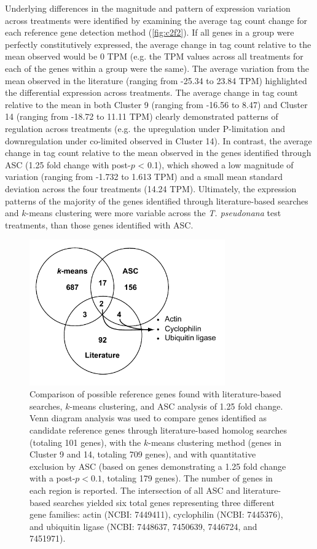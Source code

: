	Underlying differences in the magnitude and pattern of expression variation across treatments were identified by examining the average tag count change for each reference gene detection method (\cref{fig:c2f2}). If all genes in a group were perfectly constitutively expressed, the average change in tag count relative to the mean observed would be 0 TPM (e.g. the TPM values across all treatments for each of the genes within a group were the same). The average variation from the mean observed in the literature (ranging from -25.34 to 23.84 TPM) highlighted the differential expression across treatments. The average change in tag count relative to the mean in both Cluster 9 (ranging from -16.56 to 8.47) and Cluster 14 (ranging from -18.72 to 11.11 TPM) clearly demonstrated patterns of regulation across treatments (e.g. the upregulation under P-limitation and downregulation under co-limited observed in Cluster 14). In contrast, the average change in tag count relative to the mean observed in the genes identified through ASC (1.25 fold change with post-$p$ < 0.1), which showed a low magnitude of variation (ranging from -1.732 to 1.613 TPM) and a small mean standard deviation across the four treatments (14.24 TPM). Ultimately, the expression patterns of the majority of the genes identified through literature-based searches and $k$-means clustering were more variable across the \textit{T. pseudonana} test treatments, than those genes identified with ASC.\par	
\begin{figure}[h!]
  \centering
    \includegraphics[width=0.75\textwidth]{Images/C2_Figure3_v6_bw.pdf}
    \caption[Comparison of putative reference genes identified through literature, $k$-means clustering, and ASC analysis]{Comparison of possible reference genes found with literature-based searches, $k$-means clustering, and ASC analysis of 1.25 fold change. Venn diagram analysis was used to compare genes identified as candidate reference genes through literature-based homolog searches (totaling 101 genes), with the $k$-means clustering method (genes in Cluster 9 and 14, totaling 709 genes), and with quantitative exclusion by ASC (based on genes demonstrating a 1.25 fold change with a post-$p < 0.1$, totaling 179 genes). The number of genes in each region is reported. The intersection of all ASC and literature-based searches yielded six total genes representing three different gene families: actin (NCBI: 7449411), cyclophilin (NCBI: 7445376), and ubiquitin ligase (NCBI: 7448637, 7450639, 7446724, and 7451971). }
  \label{fig:c2f3}
\end{figure} 
